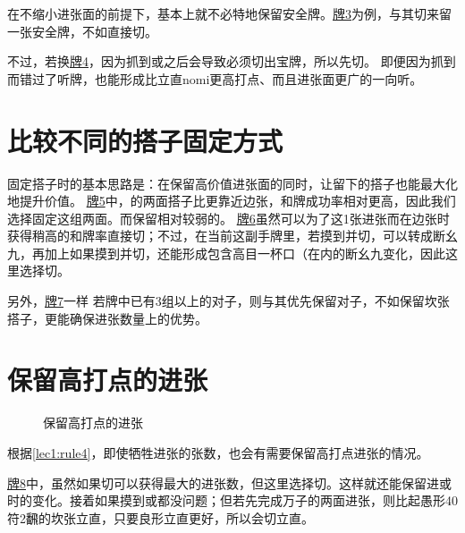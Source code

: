 在不缩小进张面的前提下，基本上就不必特地保留安全牌。\hyperref[lec7:pai3]{牌3}为例，与其切来留一张安全牌，不如直接切。

不过，若换\hyperref[lec7:pai4]{牌4}，因为抓到或之后会导致必须切出宝牌，所以先切。
即便因为抓到而错过了听牌，也能形成比立直nomi更高打点、而且进张面更广的一向听。


\section{比较不同的搭子固定方式}
固定搭子时的基本思路是：在保留高价值进张面的同时，让留下的搭子也能最大化地提升价值。
\hyperref[lec7:pai5-7]{牌5}中，的两面搭子比更靠近边张，和牌成功率相对更高，因此我们选择固定这组两面。而保留相对较弱的。
\hyperref[lec7:pai5-7]{牌6}虽然可以为了这1张进张而在边张时获得稍高的和牌率直接切；不过，在当前这副手牌里，若摸到并切，可以转成断幺九，再加上如果摸到并切，还能形成包含高目一杯口（在内的断幺九变化，因此这里选择切。

另外，\hyperref[lec7:pai5-7]{牌7}一样
若牌中已有3组以上的对子，则与其优先保留对子，不如保留坎张搭子，更能确保进张数量上的优势。

\section{保留高打点的进张}
\begin{figure}[h]
    \caption{保留高打点的进张}
    \label{lec7:pai8-10}
    \par\bigskip
    \par\bigskip
\end{figure}
根据\ref{lec1:rule4}，即使牺牲进张的张数，也会有需要保留高打点进张的情况。

\hyperref[lec7:pai8-10]{牌8}中，虽然如果切可以获得最大的进张数，但这里选择切。这样就还能保留进或时的变化。接着如果摸到或都没问题；但若先完成万子的两面进张，则比起愚形40符2飜的坎张立直，只要良形立直更好，所以会切立直。

